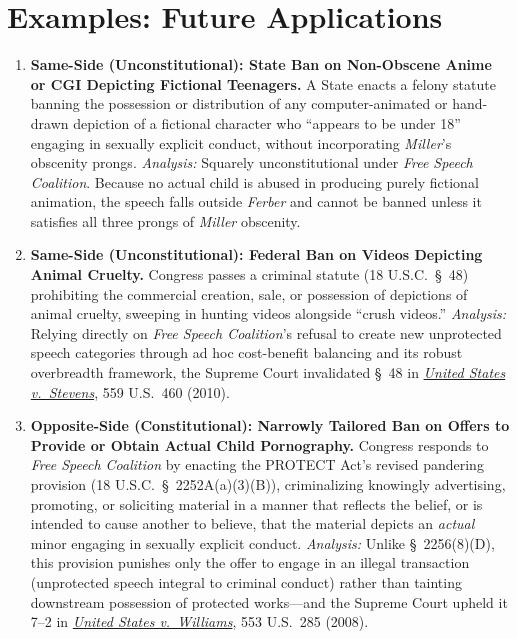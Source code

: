 \documentclass[12pt]{article}
\begin{document}
\section{Examples: Future Applications}

\begin{enumerate}
\item \textbf{Same-Side (Unconstitutional): State Ban on Non-Obscene Anime or CGI Depicting Fictional Teenagers.} A State enacts a felony statute banning the possession or distribution of any computer-animated or hand-drawn depiction of a fictional character who ``appears to be under 18'' engaging in sexually explicit conduct, without incorporating \textit{Miller}'s obscenity prongs. \textit{Analysis:} Squarely unconstitutional under \textit{Free Speech Coalition}. Because no actual child is abused in producing purely fictional animation, the speech falls outside \textit{Ferber} and cannot be banned unless it satisfies all three prongs of \textit{Miller} obscenity.
\item \textbf{Same-Side (Unconstitutional): Federal Ban on Videos Depicting Animal Cruelty.} Congress passes a criminal statute (18 U.S.C.\ \S~48) prohibiting the commercial creation, sale, or possession of depictions of animal cruelty, sweeping in hunting videos alongside ``crush videos.'' \textit{Analysis:} Relying directly on \textit{Free Speech Coalition}'s refusal to create new unprotected speech categories through ad hoc cost-benefit balancing and its robust overbreadth framework, the Supreme Court invalidated \S~48 in \href{https://supreme.justia.com/cases/federal/us/559/460/}{\textit{United States v.\ Stevens}}, 559 U.S.\ 460 (2010).
\item \textbf{Opposite-Side (Constitutional): Narrowly Tailored Ban on Offers to Provide or Obtain Actual Child Pornography.} Congress responds to \textit{Free Speech Coalition} by enacting the PROTECT Act's revised pandering provision (18 U.S.C.\ \S~2252A(a)(3)(B)), criminalizing knowingly advertising, promoting, or soliciting material in a manner that reflects the belief, or is intended to cause another to believe, that the material depicts an \textit{actual} minor engaging in sexually explicit conduct. \textit{Analysis:} Unlike \S~2256(8)(D), this provision punishes only the offer to engage in an illegal transaction (unprotected speech integral to criminal conduct) rather than tainting downstream possession of protected works---and the Supreme Court upheld it 7--2 in \href{https://supreme.justia.com/cases/federal/us/553/285/}{\textit{United States v.\ Williams}}, 553 U.S.\ 285 (2008).

\end{enumerate}
\end{document}
